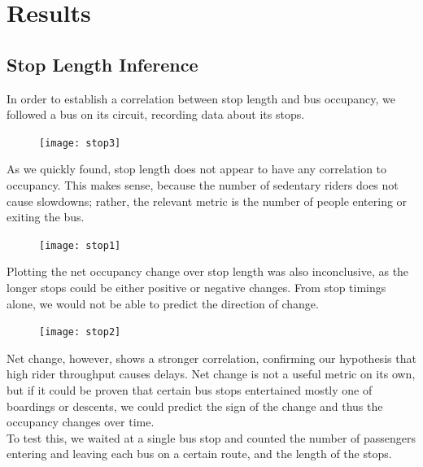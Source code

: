 \documentclass[letterpaper,abstract=on,titlepage=false]{scrreprt}
\begin{document}
\section*{Results}

\subsection*{Stop Length Inference}
	In order to establish a correlation between stop length and bus occupancy, we followed a bus on its circuit, recording data about its stops.
	\begin{figure}[H]
	\texttt{[image: stop3]}
	\centering
	\end{figure}
	As we quickly found, stop length does not appear to have any correlation to occupancy.
	This makes sense, because the number of sedentary riders does not cause slowdowns; rather, the relevant metric is the number of people entering or exiting the bus.

	\begin{figure}[H]
	\texttt{[image: stop1]}
	\centering
	\end{figure}

	Plotting the net occupancy change over stop length was also inconclusive, as the longer stops could be either positive or negative changes.
	From stop timings alone, we would not be able to predict the direction of change.

	\begin{figure}[H]
	\texttt{[image: stop2]}
	\centering
	\end{figure}

	Net change, however, shows a stronger correlation, confirming our hypothesis that high rider throughput causes delays.
	Net change is not a useful metric on its own, but if it could be proven that certain bus stops entertained mostly one of boardings or descents, we could predict the sign of the change and thus the occupancy changes over time.
	\\
	To test this, we waited at a single bus stop and counted the number of passengers entering and leaving each bus on a certain route, and the length of the stops.
\end{document}
